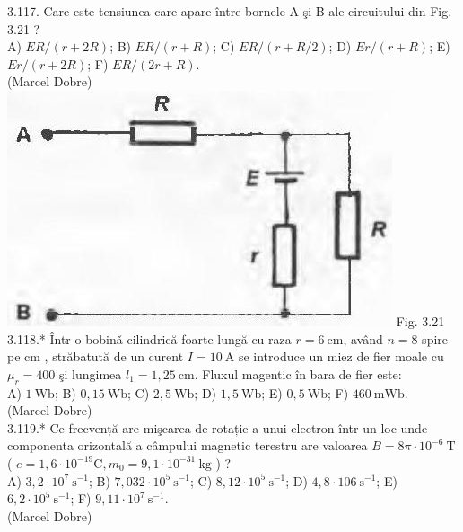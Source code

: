 \documentclass[10pt]{article}
\begin{document}
3.117. Care este tensiunea care apare între bornele A şi B ale circuitului din Fig. 3.21 ?\\ A) $E R /(r+2 R)$; B) $E R /(r+R)$; C) $E R /(r+R / 2)$; D) $E r /(r+R)$; E) $E r /(r+2 R)$; F) $E R /(2 r+R)$.\\ (Marcel Dobre)\\ \includegraphics[max width=\textwidth, center]{2025_07_01_5b3ff9fa0d508c8e9f17g-169} Fig. 3.21\\

3.118.* Într-o bobinǎ cilindrică foarte lungă cu raza $r=6 \mathrm{~cm}$, având $n=8$ spire pe cm , străbatută de un curent $I=10 \mathrm{~A}$ se introduce un miez de fier moale cu $\mu_{r}=400$ şi lungimea $l_{1}=1,25 \mathrm{~cm}$. Fluxul magentic în bara de fier este:\\ A) $1 \mathrm{~Wb}$; B) $0,15 \mathrm{~Wb}$; C) $2,5 \mathrm{~Wb}$; D) $1,5 \mathrm{~Wb}$; E) $0,5 \mathrm{~Wb}$; F) $460 \mathrm{~mWb}$.\\ (Marcel Dobre)\\

3.119.* Ce frecvență are mişcarea de rotație a unui electron într-un loc unde componenta orizontală a câmpului magnetic terestru are valoarea $B=8 \pi \cdot 10^{-6} \mathrm{~T}$ ( $e=1,6 \cdot 10^{-19} \mathrm{C}, m_{0}=9,1 \cdot 10^{-31} \mathrm{~kg}$ ) ?\\ A) $3,2 \cdot 10^{7} \mathrm{~s}^{-1}$; B) $7,032 \cdot 10^{5} \mathrm{~s}^{-1}$; C) $8,12 \cdot 10^{5} \mathrm{~s}^{-1}$; D) $4,8 \cdot 106 \mathrm{~s}^{-1}$; E) $6,2 \cdot 10^{5} \mathrm{~s}^{-1}$; F) $9,11 \cdot 10^{7} \mathrm{~s}^{-1}$.\\ (Marcel Dobre)\\
\end{document}
